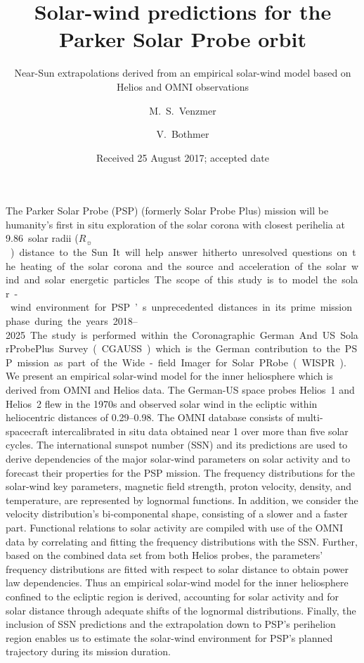 \documentclass[]{aa}
\newcommand{\Rs}{$R_\sun{}$}
\begin{document}
        \title{Solar-wind predictions for the Parker Solar Probe orbit}
        \subtitle{Near-Sun extrapolations derived from an empirical solar-wind model based on Helios and OMNI observations}
        \author{M.~S.~Venzmer
        \and V.~Bothmer}
        \date{Received 25 August 2017; accepted date}

        \abstract
        {The Parker Solar Probe (PSP) (formerly Solar Probe Plus) mission will be humanity’s first in situ exploration of the solar corona with closest perihelia at \num{9.86}~solar radii (\si{\Rs}) distance to the Sun. It will help answer hitherto unresolved questions on the heating of the solar corona and the source and acceleration of the solar wind and solar energetic particles. The scope of this study is to model the solar-wind environment for PSP’s unprecedented distances in its prime mission phase during the years \numrange{2018}{2025}. The study is performed within the Coronagraphic German And US SolarProbePlus Survey (CGAUSS)   which is the German contribution to the PSP mission as part of the Wide-field Imager for Solar PRobe (WISPR).}
        {We present an empirical solar-wind model for the inner heliosphere which is derived from OMNI and Helios data. The German-US space probes Helios~1 and Helios~2 flew in the 1970s and observed solar wind in the ecliptic within heliocentric distances of \SIrange{0.29}{0.98}{\au}. The OMNI database consists of multi-spacecraft intercalibrated in situ data obtained near \SI{1}{\au} over more than five solar cycles. The international sunspot number (SSN) and its predictions are used to derive dependencies of the major solar-wind parameters on solar activity and to forecast their properties for the PSP mission.}
        {The frequency distributions for the solar-wind key parameters, magnetic field strength, proton velocity, density, and temperature, are represented by lognormal functions. In addition, we consider the velocity distribution’s bi-componental shape, consisting of a slower and a faster part. Functional relations to solar activity are compiled with use of the OMNI data by correlating and fitting the frequency distributions with the SSN. Further, based on the combined data set from both Helios probes, the parameters’ frequency distributions are fitted with respect to solar distance to obtain power law dependencies. Thus an empirical solar-wind model for the inner heliosphere confined to the ecliptic region is derived, accounting for solar activity and for solar distance through adequate shifts of the lognormal distributions. Finally, the inclusion of SSN predictions and the extrapolation down to PSP’s perihelion region enables us to estimate the solar-wind environment for PSP’s planned trajectory during its mission duration.}
\end{document}
